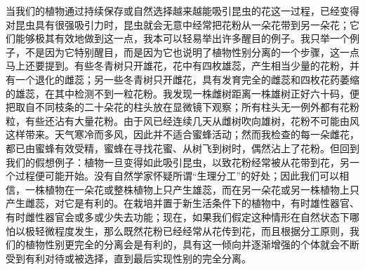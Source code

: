 {当我们的植物通过持续保存或自然选择越来越能吸引昆虫的花这一过程，已经变得对昆虫具有很强吸引力时，昆虫就会无意中经常把花粉从一朵花带到另一朵花；它们能够极其有效地做到这一点，我本可以轻易举出许多醒目的例子。我只举一个例子，不是因为它特别醒目，而是因为它也说明了植物性别分离的一个步骤，这一点马上还要提到。有些冬青树只开雄花，花中有四枚雄蕊，产生相当少量的花粉，并有一个退化的雌蕊；另一些冬青树只开雌花，具有发育完全的雌蕊和四枚花药萎缩的雄蕊，在其中检测不到一粒花粉。我发现一株雌树距离一株雄树正好六十码，便把取自不同枝条的二十朵花的柱头放在显微镜下观察；所有柱头无一例外都有花粉粒，有些还沾有大量花粉。由于风已经连续几天从雌树吹向雄树，花粉不可能由风这样带来。天气寒冷而多风，因此并不适合蜜蜂活动；然而我检查的每一朵雌花，都已由蜜蜂有效受精，蜜蜂在寻找花蜜、从树飞到树时，偶然沾上了花粉。但回到我们的假想例子：植物一旦变得如此吸引昆虫，以致花粉经常被从花带到花，另一个过程便可能开始。没有自然学家怀疑所谓“生理分工”的好处；因此我们可以相信，一株植物在一朵花或整株植物上只产生雄蕊，而在另一朵花或另一株植物上只产生雌蕊，对它是有利的。在栽培并置于新生活条件下的植物中，有时雄性器官、有时雌性器官会或多或少失去功能；现在，如果我们假定这种情形在自然状态下哪怕以极轻微程度发生，那么既然花粉已经经常从花传到花，而且根据分工原则，我们的植物性别更完全的分离会是有利的，具有这一倾向并逐渐增强的个体就会不断受到有利对待或被选择，直到最后实现性别的完全分离。}

